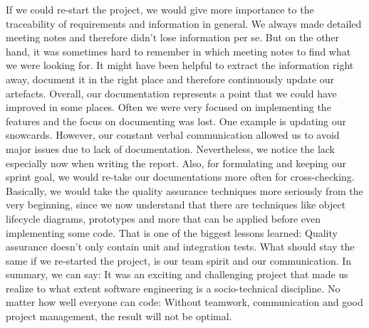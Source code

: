 If we could re-start the project, we would give more importance to the traceability of requirements and information in general.
We always made detailed meeting notes and therefore didn't lose information per se.
But on the other hand, it was sometimes hard to remember in which meeting notes to find what we were looking for.
It might have been helpful to extract the information right away, document it in the right place and therefore continuously update our artefacts.
Overall, our documentation represents a point that we could have improved in some places.
Often we were very focused on implementing the features and the focus on documenting was lost.
One example is updating our snowcards.
However, our constant verbal communication allowed us to avoid major issues due to lack of documentation.
Nevertheless, we notice the lack especially now when writing the report.
Also, for formulating and keeping our sprint goal, we would re-take our documentations more often for cross-checking.
Basically, we would take the quality assurance techniques more seriously from the very beginning, since we now understand that there are techniques like object lifecycle diagrams, prototypes and more that can be applied before even implementing some code.
That is one of the biggest lessons learned: Quality assurance doesn't only contain unit and integration tests.
What should stay the same if we re-started the project, is our team spirit and our communication.
In summary, we can say: It was an exciting and challenging project that made us realize to what extent software engineering is a socio-technical discipline.
No matter how well everyone can code: Without teamwork, communication and good project management, the result will not be optimal.